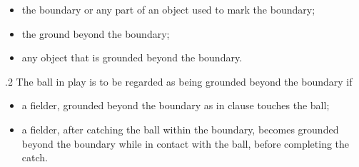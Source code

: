 \documentclass[12pt]{article}
\begin{document}
\vspace{\baselineskip}

\vspace{\baselineskip}

\vspace{\baselineskip}

\vspace{\baselineskip}

\vspace{\baselineskip}
\begin{Center}
{\fontsize{8pt}{9.6pt}\par}
\end{Center}\par


\vspace{\baselineskip}
\begin{itemize}
	\item {\fontsize{9pt}{10.8pt}\selectfont the boundary or any part of an object used to mark the boundary;\par}\par


\vspace{\baselineskip}
	\item {\fontsize{9pt}{10.8pt}\selectfont the ground beyond the boundary;\par}\par


\vspace{\baselineskip}
	\item {\fontsize{9pt}{10.8pt}\selectfont any object that is grounded beyond the boundary.\par}
\end{itemize}\par


\vspace{\baselineskip}
{\fontsize{9pt}{10.8pt}.2 \tabto{0.49in} The ball in play is to be regarded as being grounded beyond the boundary if\par}\par


\vspace{\baselineskip}
\begin{itemize}
	\item {\fontsize{9pt}{10.8pt}\selectfont a fielder, grounded beyond the boundary as in clause touches the ball;\par}\par


\vspace{\baselineskip}
	\item {\fontsize{9pt}{10.8pt}\selectfont a fielder, after catching the ball within the boundary, becomes grounded beyond the boundary while in contact with the ball, before completing the catch.\par}
\end{itemize}\par
\end{document}
